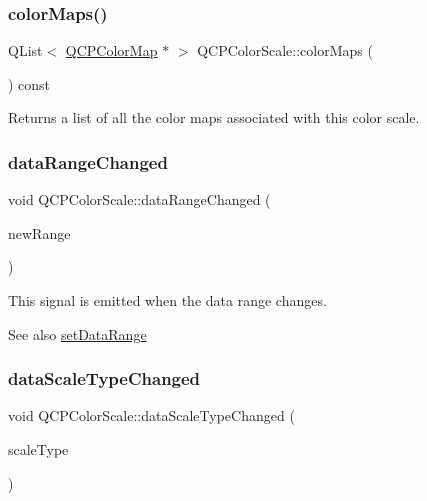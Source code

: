 \subsubsection{\texorpdfstring{color\+Maps()}{colorMaps()}}
{\footnotesize\ttfamily Q\+List$<$ \mbox{\hyperlink{class_q_c_p_color_map}{Q\+C\+P\+Color\+Map}} $\ast$ $>$ Q\+C\+P\+Color\+Scale\+::color\+Maps (\begin{DoxyParamCaption}{ }\end{DoxyParamCaption}) const}

Returns a list of all the color maps associated with this color scale. \mbox{\label{class_q_c_p_color_scale_a685717490a6aa83c5e711a4f34e837f9}} 
\subsubsection{\texorpdfstring{data\+Range\+Changed}{dataRangeChanged}}
{\footnotesize\ttfamily void Q\+C\+P\+Color\+Scale\+::data\+Range\+Changed (\begin{DoxyParamCaption}\item[{const \mbox{\hyperlink{class_q_c_p_range}{Q\+C\+P\+Range}} \&}]{new\+Range }\end{DoxyParamCaption})\hspace{0.3cm}{\ttfamily [signal]}}

This signal is emitted when the data range changes.

\begin{DoxySeeAlso}{See also}
\mbox{\hyperlink{class_q_c_p_color_scale_abe88633003a26d1e756aa74984587fef}{set\+Data\+Range}} 
\end{DoxySeeAlso}
\mbox{\label{class_q_c_p_color_scale_a61558b962f7791ff2f15a565dcf60181}} 
\subsubsection{\texorpdfstring{data\+Scale\+Type\+Changed}{dataScaleTypeChanged}}
{\footnotesize\ttfamily void Q\+C\+P\+Color\+Scale\+::data\+Scale\+Type\+Changed (\begin{DoxyParamCaption}\item[{\mbox{\hyperlink{class_q_c_p_axis_a36d8e8658dbaa179bf2aeb973db2d6f0}{Q\+C\+P\+Axis\+::\+Scale\+Type}}}]{scale\+Type }\end{DoxyParamCaption})\hspace{0.3cm}{\ttfamily [signal]}}

